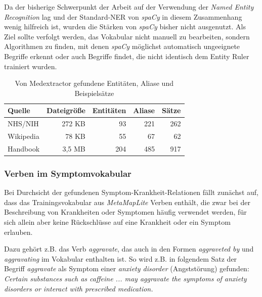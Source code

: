 Da der bisherige Schwerpunkt der Arbeit auf der Verwendung der \emph{Named Entity Recognition} lag und der Standard-NER von \emph{spaCy} in diesem Zusammenhang wenig hilfreich ist, wurden die Stärken von \emph{spaCy} bisher nicht ausgenutzt. Als Ziel sollte verfolgt werden, das Vokabular nicht manuell zu bearbeiten, sondern Algorithmen zu finden, mit denen \emph{spaCy} möglichst automatisch ungeeignete Begriffe erkennt oder auch Begriffe findet, die nicht identisch dem Entity Ruler trainiert wurden.

\begin{table}
\begin{center}
\begin{tabular}{lrrrr}
\hline
\textbf{Quelle}	& \textbf{Dateigröße}	& \textbf{Entitäten} & \textbf{Aliase} & \textbf{Sätze} \\
\hline
NHS/NIH &	272 KB & 93 & 221 & 262 \\
Wikipedia & 78 KB & 55 & 67  & 62 \\
Handbook & 3,5 MB & 204 & 485  & 917 \\
\hline
\end{tabular}
\caption{Von Medextractor gefundene Entitäten, Aliase und Beispielsätze}
\label{tab:zaehlung}
\end{center}
\end{table}

\subsubsection{Verben im Symptomvokabular}
\label{subsec: verben} 

Bei Durchsicht der gefundenen Symptom-Krankheit-Relationen fällt zunächst auf, dass das Trainingsvokabular aus \emph{MetaMapLite} Verben enthält, die zwar bei der Beschreibung von Krankheiten oder Symptomen häufig verwendet werden, für sich allein aber keine Rückschlüsse auf eine Krankheit oder ein Symptom erlauben.

Dazu gehört z.B. das Verb \emph{aggravate}, das auch in den Formen \emph{aggraveted by} und \emph{aggravating} im Vokabular enthalten ist. So wird z.B. in folgendem Satz der Begriff \emph{aggravate} als Symptom einer \emph{anxiety disorder} (Angststörung) gefunden:\\

\emph{\glqq Certain substances such as caffeine ... may aggravate the symptoms of anxiety disorders or interact with prescribed medication.\grqq}\\

